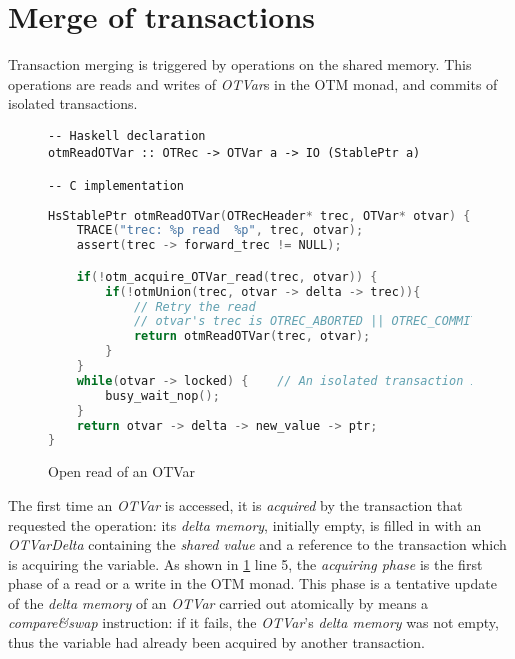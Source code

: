 \section{Merge of transactions}

Transaction merging is triggered by operations on the shared memory.
This operations are reads and writes of \emph{OTVar}s in the OTM monad, and commits of isolated transactions.

\begin{figure}
\begin{Verbatim}
-- Haskell declaration
otmReadOTVar :: OTRec -> OTVar a -> IO (StablePtr a)

-- C implementation
\end{Verbatim}
\begin{lstlisting}[language=C]
HsStablePtr otmReadOTVar(OTRecHeader* trec, OTVar* otvar) {
    TRACE("trec: %p read  %p", trec, otvar);
    assert(trec -> forward_trec != NULL);

    if(!otm_acquire_OTVar_read(trec, otvar)) {
        if(!otmUnion(trec, otvar -> delta -> trec)){
            // Retry the read
            // otvar's trec is OTREC_ABORTED || OTREC_COMMITED || OTREC_RETRYED
            return otmReadOTVar(trec, otvar);
        }
    }
    while(otvar -> locked) {    // An isolated transaction is committing
        busy_wait_nop();
    }
    return otvar -> delta -> new_value -> ptr;
}
\end{lstlisting}
\caption{Open read of an OTVar}
\label{fig:otmread}
\end{figure}

The first time an \emph{OTVar} is accessed, it is \emph{acquired} by the transaction that requested the operation: its \emph{delta memory}, initially empty, is filled in with an \emph{OTVarDelta} containing the \emph{shared value} and a reference to the transaction which is acquiring the variable.
As shown in \cref{fig:otmread} line 5, the \emph{acquiring phase} is the first phase of a read or a write in the OTM monad.
This phase is a tentative update of the \emph{delta memory} of an \emph{OTVar} carried out atomically by means a \emph{compare\&swap} instruction: if it fails, the \emph{OTVar}'s \emph{delta memory} was not empty, thus the variable had already been acquired by another transaction.

